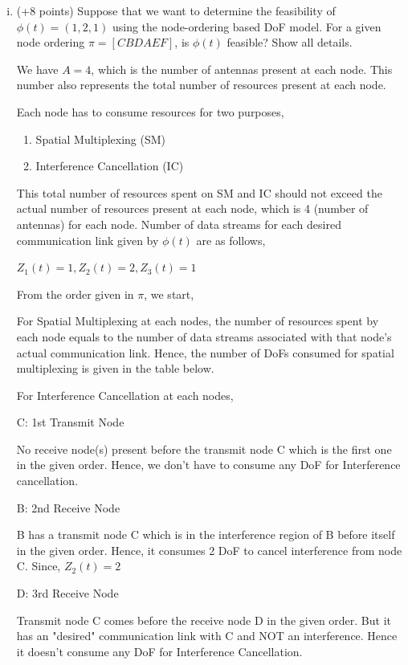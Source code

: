 \documentclass[a4paper,oneside,12pt]{report}
\begin{document}
\begin{enumerate} [(i)]

\item (+8 points) Suppose that we want to determine the feasibility of $\phi(t)=(1,2,1)$ using the node-ordering based DoF model. For a given node ordering $\pi=[C B D A E F]$, is $\phi(t)$ feasible? Show all details.

We have $A = 4$, which is the number of antennas present at each node. This number also represents the total number of resources present at each node.

Each node has to consume resources for two purposes,
\begin{enumerate}
	\item Spatial Multiplexing (SM)
	\item Interference Cancellation (IC)
\end{enumerate}

This total number of resources spent on SM and IC should not exceed the actual number of resources present at each node, which is 4 (number of antennas) for each node. Number of data streams for each desired communication link given by $\phi(t)$ are as follows,

$Z_1(t) = 1, Z_2(t) = 2, Z_3(t) = 1$

From the order given in $\pi$, we start,

For Spatial Multiplexing at each nodes, the number of resources spent by each node equals to the number of data streams associated with that node's actual communication link. Hence, the number of DoFs consumed for spatial multiplexing is given in the table below.

For Interference Cancellation at each nodes,

C: 1st Transmit Node

No receive node(s) present before the transmit node C which is the first one in the given order. Hence, we don't have to consume any DoF for Interference cancellation.

B: 2nd Receive Node

B has a transmit node C which is in the interference region of B before itself in the given order. Hence, it consumes 2 DoF to cancel interference from node C. Since, $Z_2(t) = 2$

D: 3rd Receive Node

Transmit node C comes before the receive node D in the given order. But it has an "desired" communication link with C and NOT an interference. Hence it doesn't consume any DoF for Interference Cancellation.


\end{enumerate}
\end{document}
